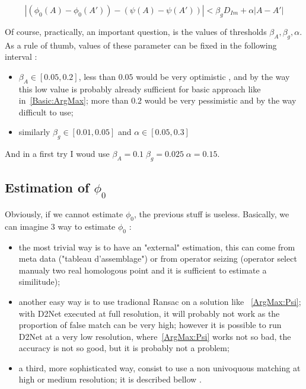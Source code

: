 \begin{equation}
     | (\phi_0(A) - \phi_0(A')) -(\psi(A) - \psi(A')) |  < \beta_g D_{Im} +  \alpha |A-A'|  \label{Phi0Im:ApproxG}
\end{equation}

Of course, practically, an important question, is the values of thresholds $\beta_A, \beta_g, \alpha $.
As a rule of thumb, values of these parameter can be fixed in the following interval :

\begin{itemize}
   \item  $\beta_A \in [0.05,0.2]$, less than $0.05$ would be very optimistic , and by the way this low
          value is probably already sufficient for basic approach like in~\ref{Basic:ArgMax};
          more than $0.2$ would be very pessimistic and by the way difficult to use;

   \item  similarly $\beta_g \in [0.01,0.05]$ and $\alpha \in [0.05,0.3]$
\end{itemize}


And in a first try I woud use $\beta_A=0.1 \;  \beta_g=0.025 \; \alpha=0.15$.


\subsection{Estimation of $\phi_0$}

Obviously, if we cannot estimate $\phi_0$, the previous stuff is useless.
Basically, we can imagine $3$ way to estimate $\phi_0$ :

\begin{itemize}
   \item  the most trivial way is to have an "external" estimation, this can come from
          meta data ("tableau d'assemblage") or from operator seizing (operator select
          manualy two real homologous point and it is sufficient to estimate a similitude);

   \item  another easy way is to use tradional Ransac on a solution like ~\ref{ArgMax:Psi}; 
          with D2Net executed at full resolution, it will probably not work as the proportion
          of false match can be very high; however it is possible to run D2Net at a very low
          resolution, where~\ref{ArgMax:Psi} works not so bad, the accuracy is not so good, but
          it is probably not a problem;

   \item  a third, more sophisticated way, consist to use a non univoquous matching at high
          or medium resolution; it is described bellow .
\end{itemize}

